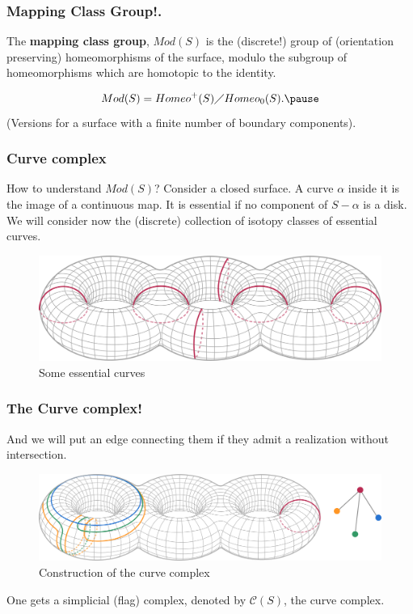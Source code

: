 \documentclass[handout]{beamer}
\theoremstyle{plain}
\begin{document}
\begin{frame}
\begin{definition}\frametitle{Mapping Class Group!.}
The  \textbf{mapping class group}, $Mod(S)$ is the  (discrete!) group  of  (orientation preserving) homeomorphisms of  the  surface, modulo  the subgroup of homeomorphisms  which  are  homotopic  to  the  identity. \pause

$$ Mod(S)= Homeo^{+}(S)\diagup Homeo_{0}(S). \pause $$
(Versions for  a  surface with  a  finite  number  of boundary  components). 
 
 \end{definition}
 \end{frame}
 


\begin{frame}\frametitle{Curve complex }
How to understand $Mod(S)$?\pause
Consider a  closed  surface. A  curve  $\alpha$ inside  it  is  the  image of  a  continuous  map. It  is  essential if no component of $S-\alpha$ is  a  disk.      
We  will  consider   now  the (discrete) collection of isotopy classes   of  essential  curves.

\begin{figure}[h!]
	\centering
	\includegraphics[scale=0.2]{CHARLA_STOCHASTIC_TOPOLOGY_MCG_CIMATNOVEMBER_2018/Pantalones.png}
	\caption{Some essential curves}
\end{figure}

\end{frame}
\begin{frame} \frametitle{The  Curve  complex!}

And  we  will  put  an edge  connecting  them  if   they  admit  a realization  without  intersection. 

\begin{figure}[h!]
	\centering
	\includegraphics[scale=0.25]{CHARLA_STOCHASTIC_TOPOLOGY_MCG_CIMATNOVEMBER_2018/Locally-infinite.png}
	\caption{Construction of the curve complex}
\end{figure}

One  gets  a simplicial  (flag) complex,  denoted  by $\mathcal{C}(S)$, the  curve  complex. \pause  
\end{frame}
\end{document}
